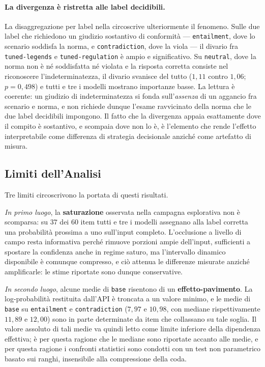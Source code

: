 \documentclass[pdflatex, sn-apa]{sn-jnl}%
\theoremstyle{thmstyleone}%
\theoremstyle{thmstyletwo}%
\theoremstyle{thmstylethree}%
\newcommand{\modelbase}{\texttt{base}}
\newcommand{\modellegends}{\texttt{tuned-legends}}
\newcommand{\modelreg}{\texttt{tuned-regulation}}
\begin{document}
\paragraph{La divergenza è ristretta alle label decidibili.}
La disaggregazione per label nella  circoscrive ulteriormente
il fenomeno. Sulle due label che richiedono un giudizio sostantivo di conformità
--- \texttt{entailment}, dove lo scenario soddisfa la norma, e
\texttt{contradiction}, dove la viola --- il divario fra \modellegends{} e
\modelreg{} è ampio e significativo. Su \texttt{neutral}, dove la norma non è né
soddisfatta né violata e la risposta corretta consiste nel riconoscere
l'indeterminatezza, il divario svanisce del tutto ($1{,}11$ contro $1{,}06$;
$p = 0{,}498$) e tutti e tre i modelli mostrano importanze basse. La lettura è
coerente: un giudizio di indeterminatezza si fonda sull'\emph{assenza} di un
aggancio fra scenario e norma, e non richiede dunque l'esame ravvicinato della
norma che le due label decidibili impongono. Il fatto che la divergenza appaia
esattamente dove il compito è sostantivo, e scompaia dove non lo è, è l'elemento
che rende l'effetto interpretabile come differenza di strategia decisionale
anziché come artefatto di misura.

\subsection{Limiti dell'Analisi}
\label{sec:xai:limits}

Tre limiti circoscrivono la portata di questi risultati.

\emph{In primo luogo}, la \textbf{saturazione} osservata nella campagna
esplorativa non è scomparsa: su $37$ dei $60$ item tutti e tre i modelli
assegnano alla label corretta una probabilità prossima a uno sull'input completo.
L'occlusione a livello di campo resta informativa perché rimuove porzioni ampie
dell'input, sufficienti a spostare la confidenza anche in regime saturo, ma
l'intervallo dinamico disponibile è comunque compresso, e ciò attenua le
differenze misurate anziché amplificarle: le stime riportate sono dunque
conservative.

\emph{In secondo luogo}, alcune medie di \modelbase{} risentono di un
\textbf{effetto-pavimento}. La log-probabilità restituita dall'API è troncata a
un valore minimo, e le medie di \modelbase{} su \texttt{entailment} e
\texttt{contradiction} ($7{,}97$ e $10{,}98$, con mediane rispettivamente $11{,}89$
e $12{,}00$) sono in parte determinate da item che collassano su tale soglia.
Il valore assoluto di tali medie va quindi letto come limite inferiore della
dipendenza effettiva; è per questa ragione che le mediane sono riportate accanto
alle medie, e per questa ragione i confronti statistici sono condotti con un test
non parametrico basato sui ranghi, insensibile alla compressione della coda.
\end{document}

